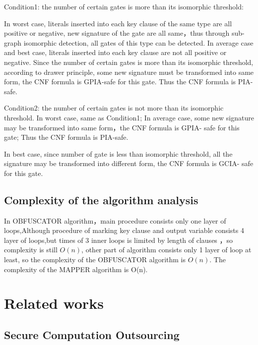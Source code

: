 \documentclass[runningheads,a4paper]{llncs}
\begin{document}
\noindent Condition1: the number of certain gates is more than its isomorphic threshold:

In worst case, literals inserted into each key clause of the same type are all positive or negative, new signature of the gate are all same，thus through sub-graph isomorphic detection, all gates of this type can be detected.
In average case and best case, literals inserted into each key clause are not all positive or negative. Since the number of certain gates is more than its isomorphic threshold, according to drawer principle, some new signature must be transformed into same form, the CNF formula is GPIA-safe for this gate. Thus the CNF formula is PIA-safe. 


\noindent Condition2: the number of certain gates is not more than its isomorphic threshold.
In worst case, same as Condition1; 
In average case, some new signature may be transformed into same form，the CNF formula is GPIA- safe for this gate; Thus the CNF formula is PIA-safe.

In best case, since number of gate is less than isomorphic threshold, all the signature may be transformed into different form, the CNF formula is GCIA- safe for this gate.

\subsection{Complexity of the algorithm analysis} 

 In OBFUSCATOR algorithm，main procedure consists only one layer of loops,Although procedure of marking key clause and output variable consists 4 layer of loops,but times of 3 inner loops is limited by length of clauses ，so complexity is still $O(n)$, other part of algorithm consists only 1 layer of loop at least, so the complexity of the OBFUSCATOR algorithm is $O (n)$. The complexity of the  MAPPER algorithm is  O(n).
\section{Related works} 
\subsection{Secure Computation Outsourcing}
\end{document}
